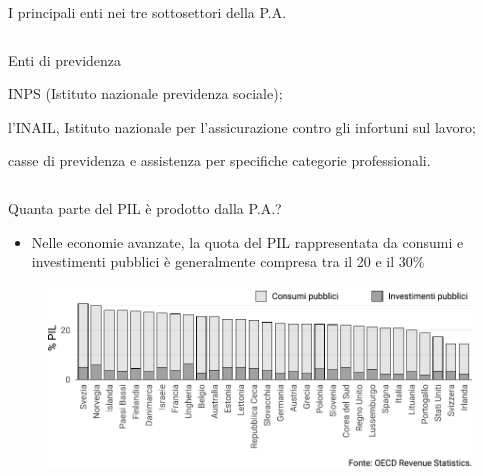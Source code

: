 \documentclass[11pt,italian]{beamer}
\newenvironment{nobulletlist}{\begin{list}{--}{\itemsep=.5pt\itemindent=2.5ex\leftmargin=0pt}}{\end{list}}
\begin{document}
\begin{frame}{I principali enti nei tre sottosettori della P.A.}
\begin{columns}[t]
\begin{column}{.33\columnwidth}
\begin{block}{\footnotesize Enti di previdenza}
\fontsize{8}{8}\selectfont
\begin{nobulletlist}
\item INPS (Istituto nazionale previdenza sociale);
\item l’INAIL, Istituto nazionale per l’assicurazione contro gli infortuni sul lavoro;
\item casse di previdenza e assistenza per specifiche categorie professionali.
\end{nobulletlist}
\end{block}
\end{column}
\end{columns}
\end{frame}

\begin{frame}{Quanta parte del PIL è prodotto dalla P.A.?}
\begin{itemize}
\item Nelle economie avanzate, la quota del PIL rappresentata da consumi e
investimenti pubblici è generalmente compresa tra il 20 e il 30\%
\end{itemize}

\begin{figure}
\centering
\includegraphics[width=.9\textwidth]{./figure/consumi-investimenti-pubblici-PIL.pdf}
\end{figure}
\end{frame}
\end{document}
